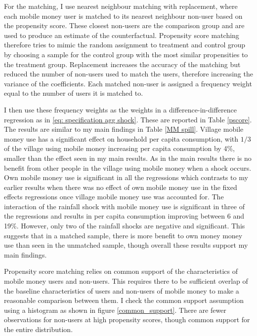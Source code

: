 For the matching, I use nearest neighbour matching with replacement, where each mobile money user is matched to its nearest neighbour non-user based on the propensity score. These closest non-users are the comparison group and are used to produce an estimate of the counterfactual. Propensity score matching therefore tries to mimic the random assignment to treatment and control group by choosing a sample for the control group with the most similar propensities to the treatment group. Replacement increases the accuracy of the matching but reduced the number of non-users used to match the users, therefore increasing the variance of the coefficients. Each matched non-user is assigned a frequency weight equal to the number of users it is matched to.

I then use these frequency weights as the weights in a difference-in-difference regression as in \eqref{eq: specification agg shock}. These are reported in Table \ref{pscore}. The results are similar to my main findings in Table \ref{MM spill}. Village mobile money use has a significant effect on household per capita consumption, with $1/3$ of the village using mobile money increasing per capita consumption by 4\%, smaller than the effect seen in my main results. As in the main results there is no benefit from other people in the village  using mobile money when a shock occurs. Own mobile money use is significant in all the regressions which contrasts to my earlier results when there was no effect of own mobile money use in the fixed effects regressions once village mobile money use was accounted for. The interaction of the rainfall shock with mobile money use is significant in three of the regressions and results in per capita consumption improving between 6 and 19\%. However, only two of the rainfall shocks are negative and significant. This suggests that in a matched sample, there is more benefit to own money money use than seen in the unmatched sample, though overall these results support my main findings. 

  

 Propensity score matching relies on common support of the characteristics of mobile money users and non-users. This requires there to be sufficient overlap of the baseline characteristics of users and non-users of mobile money to make a reasonable comparison between them. I check the common support assumption using a histogram as shown in figure \ref{common_support}. There are fewer observations for non-users at high propensity scores, though common support for the entire distribution.  

